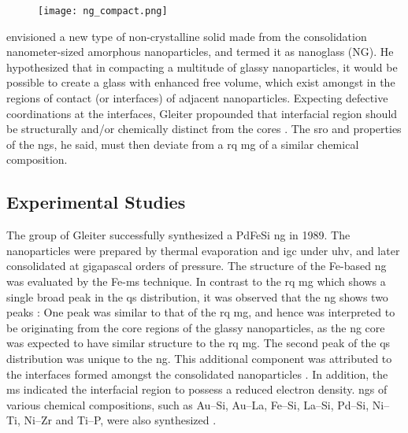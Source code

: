 \begin{figure}[!h] \centering
	\texttt{[image: ng\_compact.png]}
	\label{f:ng-sch}
\end{figure}

\textcite{Gleiter1991} envisioned a new type of non-crystalline solid made from the consolidation nanometer-sized amorphous nanoparticles, and termed it as nanoglass (NG). He hypothesized that in compacting a multitude of glassy nanoparticles, it would be possible to create a glass with enhanced free volume, which exist amongst in the regions of contact (or interfaces) of adjacent nanoparticles. Expecting defective coordinations at the interfaces, Gleiter propounded that interfacial region should be structurally and/or chemically distinct from the cores \cite{Gleiter1991, Gleiter1995}. The \gls{sro} and properties of the \gls{ng}s, he said, must then deviate from a \gls{rq} \gls{mg} of a similar chemical composition. \par

\subsection{Experimental Studies}
The group of Gleiter successfully synthesized a PdFeSi \gls{ng} \cite{Jing1989} in 1989. The nanoparticles were prepared by thermal evaporation and \gls{igc} under \gls{uhv}, and later consolidated at gigapascal orders of pressure. The structure of the  Fe-based \gls{ng} was evaluated by the Fe-\gls{ms} technique. In contrast to the \gls{rq} \gls{mg} which shows a single broad peak in the \gls{qs} distribution, it was observed that the \gls{ng} shows two peaks \cite{Jing1989}: One peak was similar to that of the \gls{rq} \gls{mg}, and hence was interpreted to be originating from the core regions of the glassy nanoparticles, as the \gls{ng} core was expected to have similar structure to the \gls{rq} \gls{mg}. The second peak of the \gls{qs} distribution was unique to the \gls{ng}. This additional component was attributed to the interfaces formed amongst the consolidated nanoparticles \cite{Jing1989}. In addition, the \gls{ms} indicated the interfacial region to possess a reduced electron density. \gls{ng}s of various chemical compositions, such as Au–Si, Au–La, Fe–Si, La–Si, Pd–Si, Ni–Ti, Ni–Zr and Ti–P, were also synthesized \cite{Weissmuller1992}. \par


